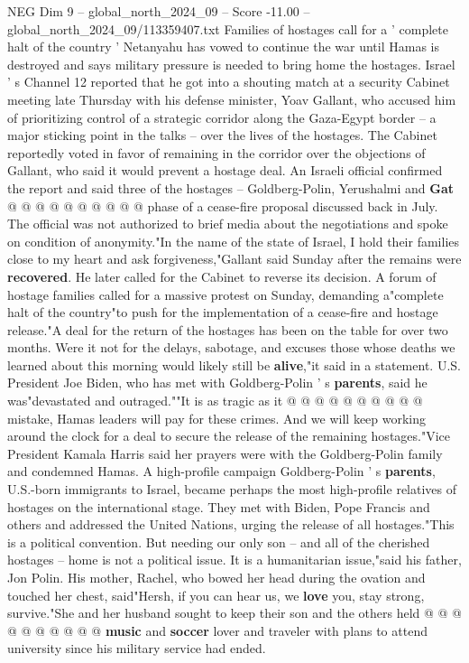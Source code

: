 \begin{textsample}{NEG Dim 9 – global\_north\_2024\_09 – Score -11.00 – global\_north\_2024\_09/113359407.txt}
Families of hostages call for a ' complete halt of the country ' Netanyahu has vowed to continue the war until Hamas is destroyed and says military pressure is needed to bring home the hostages.
Israel ' s Channel 12 reported that he got into a shouting match at a security Cabinet meeting late Thursday with his defense minister, Yoav Gallant, who accused him of prioritizing control of a strategic corridor along the Gaza-Egypt border -- a major sticking point in the talks -- over the lives of the hostages.
The Cabinet reportedly voted in favor of remaining in the corridor over the objections of Gallant, who said it would prevent a hostage deal.
An Israeli official confirmed the report and said three of the hostages -- Goldberg-Polin, Yerushalmi and \textbf{Gat} @ @ @ @ @ @ @ @ @ @ phase of a cease-fire proposal discussed back in July.
The official was not authorized to brief media about the negotiations and spoke on condition of anonymity."In the name of the state of Israel, I hold their families close to my heart and ask forgiveness,"Gallant said Sunday after the remains were \textbf{recovered}.
He later called for the Cabinet to reverse its decision.
A forum of hostage families called for a massive protest on Sunday, demanding a"complete halt of the country"to push for the implementation of a cease-fire and hostage release."A deal for the return of the hostages has been on the table for over two months.
Were it not for the delays, sabotage, and excuses those whose deaths we learned about this morning would likely still be \textbf{alive},"it said in a statement.
U.S.
President Joe Biden, who has met with Goldberg-Polin ' s \textbf{parents}, said he was"devastated and outraged.""It is as tragic as it @ @ @ @ @ @ @ @ @ @ mistake, Hamas leaders will pay for these crimes.
And we will keep working around the clock for a deal to secure the release of the remaining hostages."Vice President Kamala Harris said her prayers were with the Goldberg-Polin family and condemned Hamas.
A high-profile campaign Goldberg-Polin ' s \textbf{parents}, U.S.-born immigrants to Israel, became perhaps the most high-profile relatives of hostages on the international stage.
They met with Biden, Pope Francis and others and addressed the United Nations, urging the release of all hostages."This is a political convention.
But needing our only son -- and all of the cherished hostages -- home is not a political issue.
It is a humanitarian issue,"said his father, Jon Polin.
His mother, Rachel, who bowed her head during the ovation and touched her chest, said"Hersh, if you can hear us, we \textbf{love} you, stay strong, survive."She and her husband sought to keep their son and the others held @ @ @ @ @ @ @ @ @ @ \textbf{music} and \textbf{soccer} lover and traveler with plans to attend university since his military service had ended.

\end{textsample}
